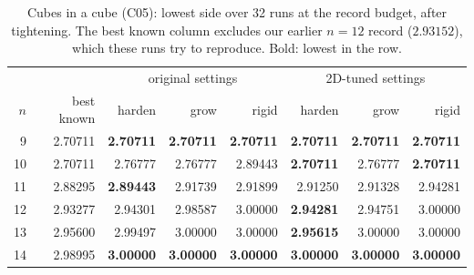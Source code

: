\begin{table}[t]\centering\small
\begin{tabular}{rrrrrrrr}
\toprule
 & & \multicolumn{3}{c}{original settings} & \multicolumn{3}{c}{2D-tuned settings}\\
$n$ & best known & harden & grow & rigid & harden & grow & rigid\\
\midrule
9 & 2.70711 & \textbf{2.70711} & \textbf{2.70711} & \textbf{2.70711} & \textbf{2.70711} & \textbf{2.70711} & \textbf{2.70711}\\
10 & 2.70711 & 2.76777 & 2.76777 & 2.89443 & \textbf{2.70711} & 2.76777 & \textbf{2.70711}\\
11 & 2.88295 & \textbf{2.89443} & 2.91739 & 2.91899 & 2.91250 & 2.91328 & 2.94281\\
12 & 2.93277 & 2.94301 & 2.98587 & 3.00000 & \textbf{2.94281} & 2.94751 & 3.00000\\
13 & 2.95600 & 2.99497 & 3.00000 & 3.00000 & \textbf{2.95615} & 3.00000 & 3.00000\\
14 & 2.98995 & \textbf{3.00000} & \textbf{3.00000} & \textbf{3.00000} & \textbf{3.00000} & \textbf{3.00000} & \textbf{3.00000}\\
\bottomrule
\end{tabular}
\caption{Cubes in a cube (C05): lowest side over 32 runs at the record budget, after tightening. The best known column excludes our earlier $n=12$ record ($2.93152$), which these runs try to reproduce. Bold: lowest in the row.}
\label{tab:cubes}
\end{table}
